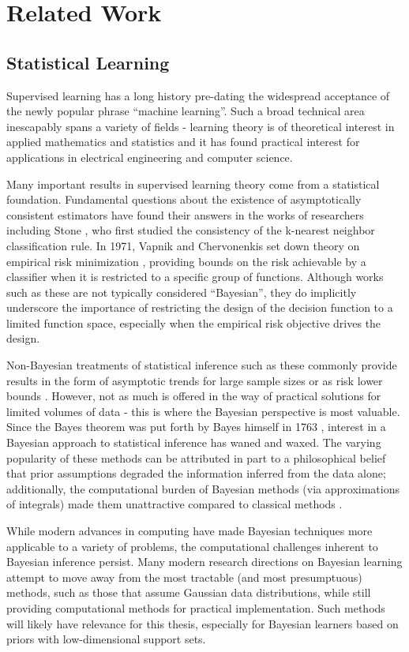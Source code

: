 \documentclass[12pt]{report}
\begin{document}
\chapter{Related Work} \label{sec:related}

\section{Statistical Learning}

Supervised learning has a long history pre-dating the widespread acceptance of the newly popular phrase ``machine learning''. Such a broad technical area inescapably spans a variety of fields - learning theory is of theoretical interest in applied mathematics and statistics and it has found practical interest for applications in electrical engineering and computer science. 

Many important results in supervised learning theory come from a statistical foundation. Fundamental questions about the existence of asymptotically consistent estimators have found their answers in the works of researchers including Stone \cite{stone}, who first studied the consistency of the k-nearest neighbor classification rule. In 1971, Vapnik and Chervonenkis set down theory on empirical risk minimization \cite{vapnik}, providing bounds on the risk achievable by a classifier when it is restricted to a specific group of functions. Although works such as these are not typically considered ``Bayesian'', they do implicitly underscore the importance of restricting the design of the decision function to a limited function space, especially when the empirical risk objective drives the design.

Non-Bayesian treatments of statistical inference such as these commonly provide results in the form of asymptotic trends for large sample sizes or as risk lower bounds \cite{devroye}. However, not as much is offered in the way of practical solutions for limited volumes of data - this is where the Bayesian perspective is most valuable. Since the Bayes theorem was put forth by Bayes himself in 1763 \cite{bayes}, interest in a Bayesian approach to statistical inference has waned and waxed. The varying popularity of these methods can be attributed in part to a philosophical belief that prior assumptions degraded the information inferred from the data alone; additionally, the computational burden of Bayesian methods (via approximations of integrals) made them unattractive compared to classical methods \cite{box}.

While modern advances in computing have made Bayesian techniques more applicable to a variety of problems, the computational challenges inherent to Bayesian inference persist. Many modern research directions on Bayesian learning attempt to move away from the most tractable (and most presumptuous) methods, such as those that assume Gaussian data distributions, while still providing computational methods for practical implementation. Such methods will likely have relevance for this thesis, especially for Bayesian learners based on priors with low-dimensional support sets.
\end{document}
